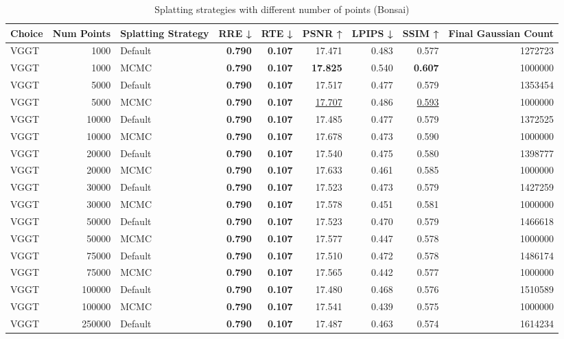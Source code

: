 \begin{table}[H]
\caption{Splatting strategies with different number of points (Bonsai)}
\label{tab:09_splatting_strategy_points_bonsai}
\begin{tabular}{lrlrrrrrr}
\toprule
Choice & Num Points & Splatting Strategy & RRE ↓ & RTE ↓ & PSNR ↑ & LPIPS ↓ & SSIM ↑ & Final Gaussian Count \\
\midrule
VGGT & 1000 & Default & \textbf{0.790} & \textbf{0.107} & 17.471 & 0.483 & 0.577 & 1272723 \\
VGGT & 1000 & MCMC & \textbf{0.790} & \textbf{0.107} & \textbf{17.825} & 0.540 & \textbf{0.607} & 1000000 \\
VGGT & 5000 & Default & \textbf{0.790} & \textbf{0.107} & 17.517 & 0.477 & 0.579 & 1353454 \\
VGGT & 5000 & MCMC & \textbf{0.790} & \textbf{0.107} & \underline{17.707} & 0.486 & \underline{0.593} & 1000000 \\
VGGT & 10000 & Default & \textbf{0.790} & \textbf{0.107} & 17.485 & 0.477 & 0.579 & 1372525 \\
VGGT & 10000 & MCMC & \textbf{0.790} & \textbf{0.107} & 17.678 & 0.473 & 0.590 & 1000000 \\
VGGT & 20000 & Default & \textbf{0.790} & \textbf{0.107} & 17.540 & 0.475 & 0.580 & 1398777 \\
VGGT & 20000 & MCMC & \textbf{0.790} & \textbf{0.107} & 17.633 & 0.461 & 0.585 & 1000000 \\
VGGT & 30000 & Default & \textbf{0.790} & \textbf{0.107} & 17.523 & 0.473 & 0.579 & 1427259 \\
VGGT & 30000 & MCMC & \textbf{0.790} & \textbf{0.107} & 17.578 & 0.451 & 0.581 & 1000000 \\
VGGT & 50000 & Default & \textbf{0.790} & \textbf{0.107} & 17.523 & 0.470 & 0.579 & 1466618 \\
VGGT & 50000 & MCMC & \textbf{0.790} & \textbf{0.107} & 17.577 & 0.447 & 0.578 & 1000000 \\
VGGT & 75000 & Default & \textbf{0.790} & \textbf{0.107} & 17.510 & 0.472 & 0.578 & 1486174 \\
VGGT & 75000 & MCMC & \textbf{0.790} & \textbf{0.107} & 17.565 & 0.442 & 0.577 & 1000000 \\
VGGT & 100000 & Default & \textbf{0.790} & \textbf{0.107} & 17.480 & 0.468 & 0.576 & 1510589 \\
VGGT & 100000 & MCMC & \textbf{0.790} & \textbf{0.107} & 17.541 & 0.439 & 0.575 & 1000000 \\
VGGT & 250000 & Default & \textbf{0.790} & \textbf{0.107} & 17.487 & 0.463 & 0.574 & 1614234 \\

\end{tabular}
\end{table}
